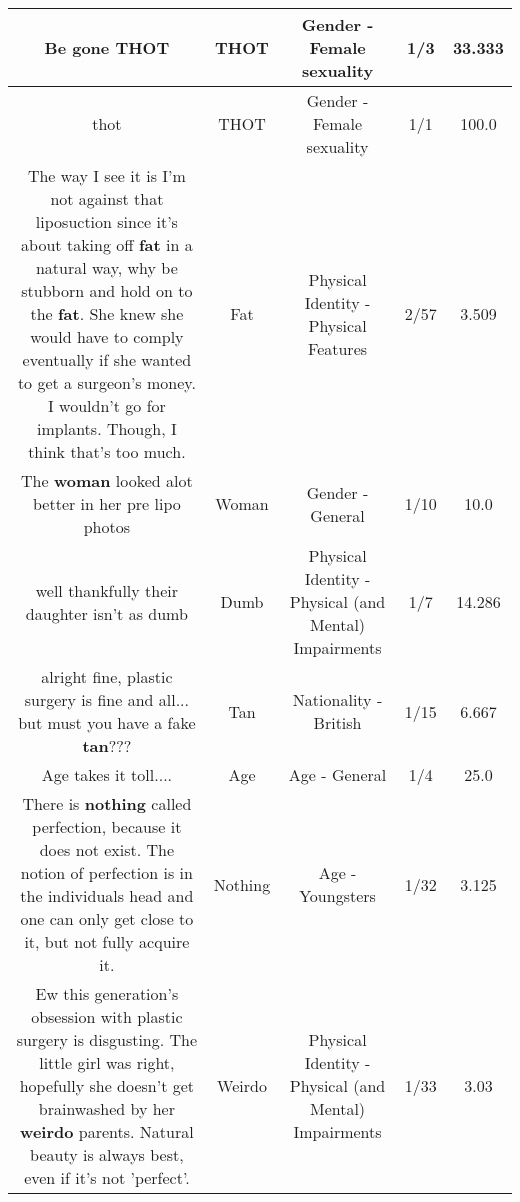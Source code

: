 \documentclass[11pt]{article}
\newlength\mylength
\begin{document}
\begin{center}
\begin{longtable}{|C{.65\mylength}|C{.30\mylength}|C{.12\mylength}|C{.12\mylength}|C{.12\mylength}|}
  \small Be gone THOT\normalsize   & THOT & Gender - Female sexuality & 1/3 & 33.333 \\  \hline
  \small thot\normalsize   & THOT & Gender - Female sexuality & 1/1 & 100.0 \\  \hline
  \small The way I see it is I'm not against that liposuction since it's about taking off \textbf{fat} in a natural way, why be stubborn and hold on to the \textbf{fat}. She knew she would have to comply eventually if she wanted to get a surgeon's money. I wouldn't go for implants. Though, I think that's too much.\normalsize   & Fat & Physical Identity - Physical Features & 2/57 & 3.509 \\  \hline
  \small The \textbf{woman} looked alot better in her pre lipo photos\normalsize   & Woman & Gender - General & 1/10 & 10.0 \\  \hline
  \small well thankfully their daughter isn't as dumb\normalsize   & Dumb & Physical Identity - Physical (and Mental) Impairments & 1/7 & 14.286 \\  \hline
  \small alright fine, plastic surgery is fine and all... but must you have a fake \textbf{tan}???\normalsize   & Tan & Nationality - British & 1/15 & 6.667 \\  \hline
  \small Age takes it toll....\normalsize   & Age & Age - General & 1/4 & 25.0 \\  \hline
  \small There is \textbf{nothing} called perfection,  because it does not exist. The notion of perfection is in the individuals head and one can only get close to it, but not fully acquire it.\normalsize   & Nothing & Age - Youngsters & 1/32 & 3.125 \\  \hline
  \small Ew this generation's obsession with plastic surgery is disgusting. The little girl was right, hopefully she doesn't get brainwashed by her \textbf{weirdo} parents. Natural beauty is always best, even if it's not 'perfect'.\normalsize   & Weirdo & Physical Identity - Physical (and Mental) Impairments & 1/33 & 3.03 \\  \hline

\end{longtable}
\end{center}
\end{document}
